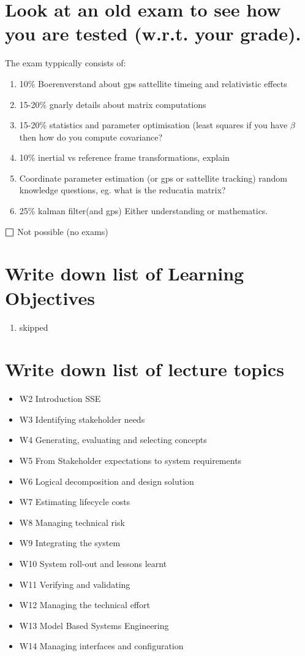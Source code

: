\section{Look at an old exam to see how you are tested (w.r.t. your grade).}
The exam typpically consists of:
\begin{enumerate}
    \item 10\% Boerenverstand about gps sattellite timeing and relativistic effects
    \item 15-20\% gnarly details about matrix computations
    \item 15-20\% statistics and parameter optimisation (least squares if you have $\beta$ then how do you compute covariance?
    \item 10\% inertial vs reference frame transformations, explain
    \item Coordinate parameter estimation (or gps or sattellite tracking) random knowledge questions, eg. what is the reducatia matrix?
    \item 25\% kalman filter(and gps) Either understanding or mathematics.
\end{enumerate}
$\msquare$
    Not possible (no exams)




\section{Write down list of Learning Objectives}
\begin{enumerate}
    \item skipped
\end{enumerate}
\section{Write down list of lecture topics}
\begin{itemize}
	\item W2 Introduction SSE
	\item W3 Identifying stakeholder needs
	\item W4 Generating, evaluating and selecting concepts
	\item W5 From Stakeholder expectations to system requirements 
	\item W6 Logical decomposition and design solution
	\item W7 Estimating lifecycle costs
	\item W8 Managing technical risk
	\item W9 Integrating the system
	\item W10 System roll-out and lessons learnt
	\item W11 Verifying and validating
	\item W12 Managing the technical effort
	\item W13 Model Based Systems Engineering
	\item W14 Managing interfaces and configuration
\end{itemize}

